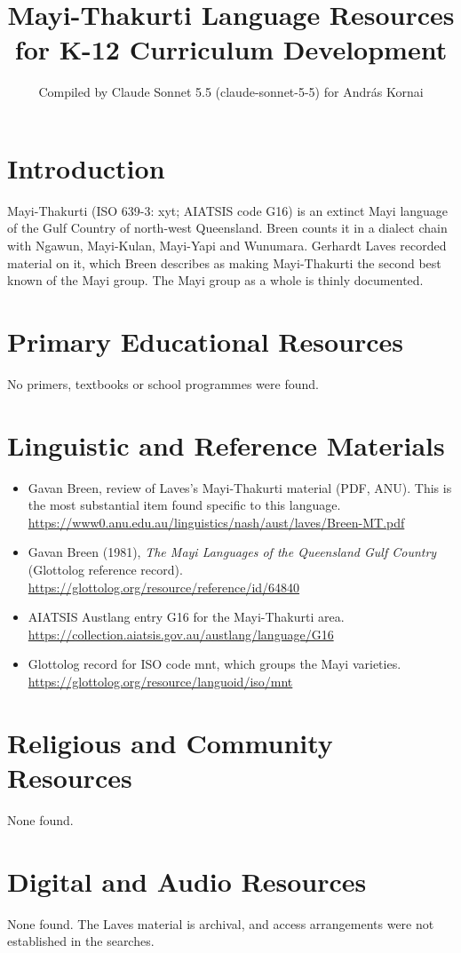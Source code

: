 \documentclass[12pt]{article}
\title{Mayi-Thakurti Language Resources for K-12 Curriculum Development}
\author{Compiled by Claude Sonnet 5.5 (claude-sonnet-5-5) for Andr\'as Kornai}
\date{}
\begin{document}
\maketitle

\section{Introduction}
Mayi-Thakurti (ISO 639-3: xyt; AIATSIS code G16) is an extinct Mayi language of the Gulf Country of north-west Queensland. Breen counts it in a dialect chain with Ngawun, Mayi-Kulan, Mayi-Yapi and Wunumara. Gerhardt Laves recorded material on it, which Breen describes as making Mayi-Thakurti the second best known of the Mayi group. The Mayi group as a whole is thinly documented.

\section{Primary Educational Resources}
No primers, textbooks or school programmes were found.

\section{Linguistic and Reference Materials}
\begin{itemize}
\item Gavan Breen, review of Laves's Mayi-Thakurti material (PDF, ANU). This is the most substantial item found specific to this language. \url{https://www0.anu.edu.au/linguistics/nash/aust/laves/Breen-MT.pdf}
\item Gavan Breen (1981), \emph{The Mayi Languages of the Queensland Gulf Country} (Glottolog reference record). \url{https://glottolog.org/resource/reference/id/64840}
\item AIATSIS Austlang entry G16 for the Mayi-Thakurti area. \url{https://collection.aiatsis.gov.au/austlang/language/G16}
\item Glottolog record for ISO code mnt, which groups the Mayi varieties. \url{https://glottolog.org/resource/languoid/iso/mnt}
\end{itemize}

\section{Religious and Community Resources}
None found.

\section{Digital and Audio Resources}
None found. The Laves material is archival, and access arrangements were not established in the searches.
\end{document}
